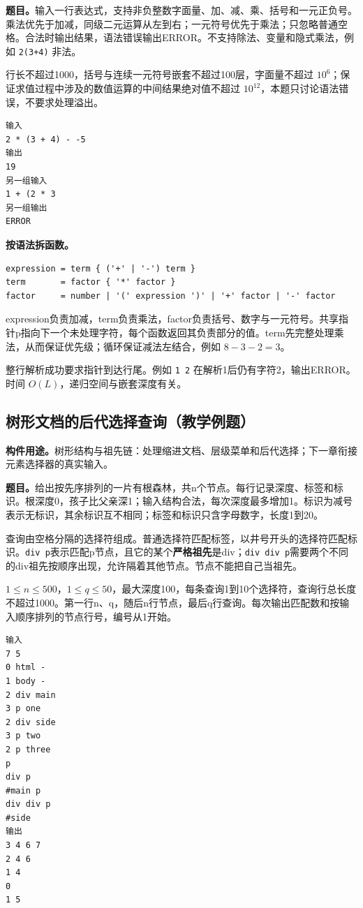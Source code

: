 \noindent\textbf{题目。}输入一行表达式，支持非负整数字面量、加、减、乘、括号和一元正负号。乘法优先于加减，同级二元运算从左到右；一元符号优先于乘法；只忽略普通空格。合法时输出结果，语法错误输出ERROR。不支持除法、变量和隐式乘法，例如 \texttt{2(3+4)} 非法。

行长不超过1000，括号与连续一元符号嵌套不超过100层，字面量不超过 $10^6$；保证求值过程中涉及的数值运算的中间结果绝对值不超过 $10^{12}$，本题只讨论语法错误，不要求处理溢出。
\begin{verbatim}
输入
2 * (3 + 4) - -5
输出
19
另一组输入
1 + (2 * 3
另一组输出
ERROR
\end{verbatim}

\noindent\textbf{按语法拆函数。}
\begin{verbatim}
expression = term { ('+' | '-') term }
term       = factor { '*' factor }
factor     = number | '(' expression ')' | '+' factor | '-' factor
\end{verbatim}
expression负责加减，term负责乘法，factor负责括号、数字与一元符号。共享指针p指向下一个未处理字符，每个函数返回其负责部分的值。term先完整处理乘法，从而保证优先级；循环保证减法左结合，例如 $8-3-2=3$。

整行解析成功要求指针到达行尾。例如 \texttt{1 2} 在解析1后仍有字符2，输出ERROR。时间 $O(L)$，递归空间与嵌套深度有关。

\subsection{树形文档的后代选择查询（教学例题）}
\noindent\textbf{构件用途。}树形结构与祖先链：处理缩进文档、层级菜单和后代选择；下一章衔接元素选择器的真实输入。


\noindent\textbf{题目。}给出按先序排列的一片有根森林，共n个节点。每行记录深度、标签和标识。根深度0，孩子比父亲深1；输入结构合法，每次深度最多增加1。标识为减号表示无标识，其余标识互不相同；标签和标识只含字母数字，长度1到20。

查询由空格分隔的选择符组成。普通选择符匹配标签，以井号开头的选择符匹配标识。\texttt{div p}表示匹配p节点，且它的某个\textbf{严格祖先}是div；\texttt{div div p}需要两个不同的div祖先按顺序出现，允许隔着其他节点。节点不能把自己当祖先。

$1\le n\le500$，$1\le q\le50$，最大深度100，每条查询1到10个选择符，查询行总长度不超过1000。第一行n、q，随后n行节点，最后q行查询。每次输出匹配数和按输入顺序排列的节点行号，编号从1开始。
\begin{verbatim}
输入
7 5
0 html -
1 body -
2 div main
3 p one
2 div side
3 p two
2 p three
p
div p
#main p
div div p
#side
输出
3 4 6 7
2 4 6
1 4
0
1 5
\end{verbatim}

